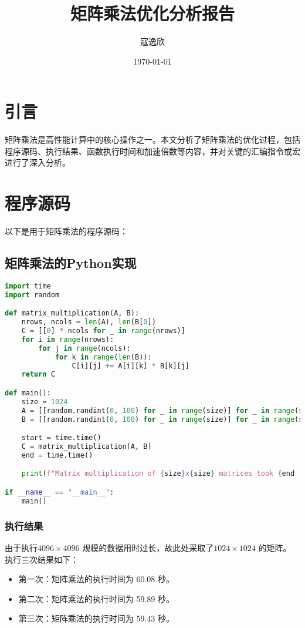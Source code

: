 \documentclass[a4paper,12pt]{ctexart}
\title{矩阵乘法优化分析报告}
\author{寇逸欣}
\date{\today}
\begin{document}
\maketitle
\tableofcontents

\section{引言}
矩阵乘法是高性能计算中的核心操作之一。本文分析了矩阵乘法的优化过程，包括程序源码、执行结果、函数执行时间和加速倍数等内容，并对关键的汇编指令或宏进行了深入分析。

\section{程序源码}
以下是用于矩阵乘法的程序源码：

\subsection{矩阵乘法的Python实现}
\begin{lstlisting}[language=Python, caption={矩阵乘法Python源码}]
import time
import random

def matrix_multiplication(A, B):
    nrows, ncols = len(A), len(B[0])
    C = [[0] * ncols for _ in range(nrows)]
    for i in range(nrows):
        for j in range(ncols):
            for k in range(len(B)):
                C[i][j] += A[i][k] * B[k][j]
    return C

def main():
    size = 1024
    A = [[random.randint(0, 100) for _ in range(size)] for _ in range(size)]
    B = [[random.randint(0, 100) for _ in range(size)] for _ in range(size)]

    start = time.time()
    C = matrix_multiplication(A, B)
    end = time.time()

    print(f"Matrix multiplication of {size}x{size} matrices took {end - start:.2f} seconds.")

if __name__ == "__main__":
    main()
\end{lstlisting}

\subsubsection{执行结果}
由于执行$4096 \times 4096$ 规模的数据用时过长，故此处采取了$1024 \times 1024$ 的矩阵。
执行三次结果如下：
\begin{itemize}
    \item 第一次：矩阵乘法的执行时间为 60.08 秒。
    \item 第二次：矩阵乘法的执行时间为 59.89 秒。
    \item 第三次：矩阵乘法的执行时间为 59.43 秒。
\end{itemize}
\end{document}
